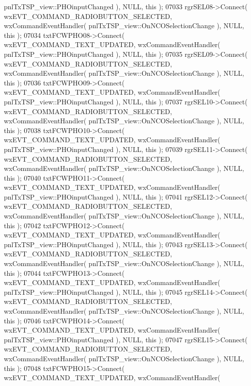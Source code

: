 \begin{DoxyCode}
      pnlTxTSP_view::PHOinputChanged ), NULL, \textcolor{keyword}{this} );
07033     rgrSEL08->Connect( wxEVT\_COMMAND\_RADIOBUTTON\_SELECTED, wxCommandEventHandler( 
      pnlTxTSP_view::OnNCOSelectionChange ), NULL, \textcolor{keyword}{this} );
07034     txtFCWPHO08->Connect( wxEVT\_COMMAND\_TEXT\_UPDATED, wxCommandEventHandler( 
      pnlTxTSP_view::PHOinputChanged ), NULL, \textcolor{keyword}{this} );
07035     rgrSEL09->Connect( wxEVT\_COMMAND\_RADIOBUTTON\_SELECTED, wxCommandEventHandler( 
      pnlTxTSP_view::OnNCOSelectionChange ), NULL, \textcolor{keyword}{this} );
07036     txtFCWPHO09->Connect( wxEVT\_COMMAND\_TEXT\_UPDATED, wxCommandEventHandler( 
      pnlTxTSP_view::PHOinputChanged ), NULL, \textcolor{keyword}{this} );
07037     rgrSEL10->Connect( wxEVT\_COMMAND\_RADIOBUTTON\_SELECTED, wxCommandEventHandler( 
      pnlTxTSP_view::OnNCOSelectionChange ), NULL, \textcolor{keyword}{this} );
07038     txtFCWPHO10->Connect( wxEVT\_COMMAND\_TEXT\_UPDATED, wxCommandEventHandler( 
      pnlTxTSP_view::PHOinputChanged ), NULL, \textcolor{keyword}{this} );
07039     rgrSEL11->Connect( wxEVT\_COMMAND\_RADIOBUTTON\_SELECTED, wxCommandEventHandler( 
      pnlTxTSP_view::OnNCOSelectionChange ), NULL, \textcolor{keyword}{this} );
07040     txtFCWPHO11->Connect( wxEVT\_COMMAND\_TEXT\_UPDATED, wxCommandEventHandler( 
      pnlTxTSP_view::PHOinputChanged ), NULL, \textcolor{keyword}{this} );
07041     rgrSEL12->Connect( wxEVT\_COMMAND\_RADIOBUTTON\_SELECTED, wxCommandEventHandler( 
      pnlTxTSP_view::OnNCOSelectionChange ), NULL, \textcolor{keyword}{this} );
07042     txtFCWPHO12->Connect( wxEVT\_COMMAND\_TEXT\_UPDATED, wxCommandEventHandler( 
      pnlTxTSP_view::PHOinputChanged ), NULL, \textcolor{keyword}{this} );
07043     rgrSEL13->Connect( wxEVT\_COMMAND\_RADIOBUTTON\_SELECTED, wxCommandEventHandler( 
      pnlTxTSP_view::OnNCOSelectionChange ), NULL, \textcolor{keyword}{this} );
07044     txtFCWPHO13->Connect( wxEVT\_COMMAND\_TEXT\_UPDATED, wxCommandEventHandler( 
      pnlTxTSP_view::PHOinputChanged ), NULL, \textcolor{keyword}{this} );
07045     rgrSEL14->Connect( wxEVT\_COMMAND\_RADIOBUTTON\_SELECTED, wxCommandEventHandler( 
      pnlTxTSP_view::OnNCOSelectionChange ), NULL, \textcolor{keyword}{this} );
07046     txtFCWPHO14->Connect( wxEVT\_COMMAND\_TEXT\_UPDATED, wxCommandEventHandler( 
      pnlTxTSP_view::PHOinputChanged ), NULL, \textcolor{keyword}{this} );
07047     rgrSEL15->Connect( wxEVT\_COMMAND\_RADIOBUTTON\_SELECTED, wxCommandEventHandler( 
      pnlTxTSP_view::OnNCOSelectionChange ), NULL, \textcolor{keyword}{this} );
07048     txtFCWPHO15->Connect( wxEVT\_COMMAND\_TEXT\_UPDATED, wxCommandEventHandler( 

\end{DoxyCode}
